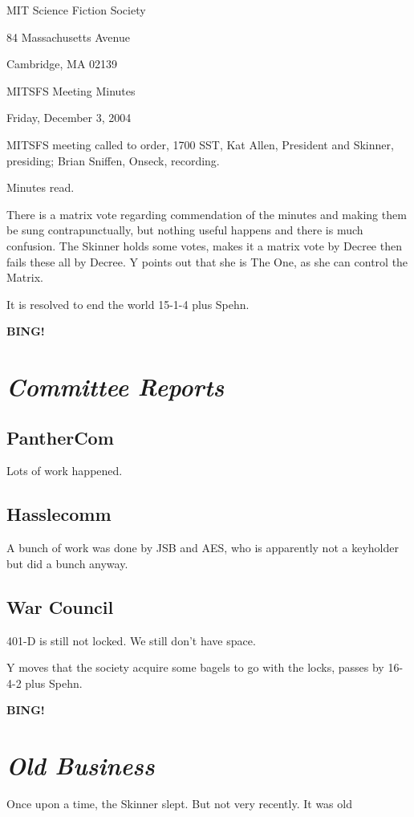 \documentclass[10pt]{article}
\newcommand{\bing}{{\bf BING!} }
\newcommand{\goto}[1]{\bing \vskip 12pt \section*{{\em{#1}}}}
\newcommand{\ps}{ plus Spehn\xspace}
\begin{document}
\begin{center}

MIT Science Fiction Society

84 Massachusetts Avenue

Cambridge, MA 02139

\vspace{12pt}

MITSFS Meeting Minutes

Friday, December 3, 2004

\end{center}

\vspace{18pt}

\setlength{\parskip}{6pt}

\noindent
MITSFS meeting called to order, 1700 SST, Kat Allen, President and
Skinner, presiding; Brian Sniffen,  Onseck, recording.

Minutes read.

There is a matrix vote regarding commendation of the minutes and
making them be sung contrapunctually, but nothing useful happens and
there is much confusion.  The Skinner holds some votes, makes it a
matrix vote by Decree then fails these all by Decree. Y points out
that she is The One, as she can control the Matrix.

It is resolved to end the world  15-1-4\ps.

\goto{Committee Reports}
\subsection*{PantherCom}
Lots of work happened.

\subsection*{Hasslecomm}
A bunch of work was done by JSB and AES, who is apparently not a
keyholder but did a bunch anyway.

\subsection*{War Council}
401-D is still not locked.  We still don't have space.

Y moves that the society acquire some bagels to go with the locks,
passes by 16-4-2\ps.

\goto{Old Business}

Once upon a time, the Skinner slept.  But not very recently.  It was old
\end{document}
